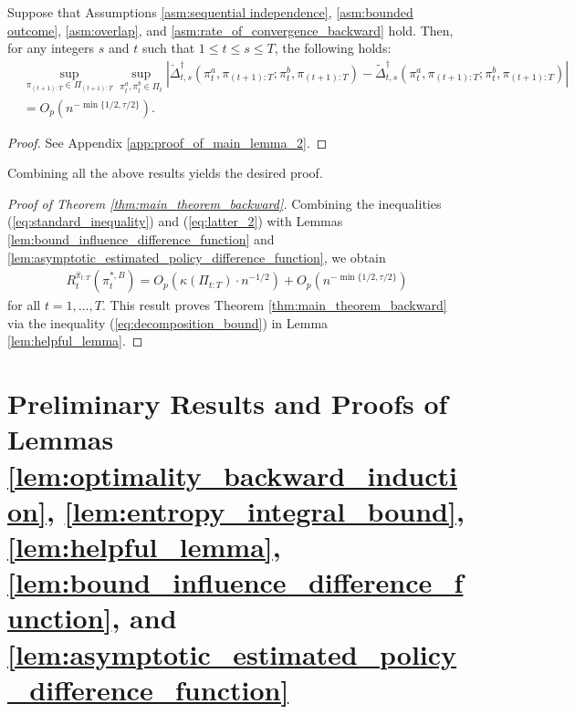 \begin{lemma}\label{lem:asymptotic_estimated_policy_difference_function}
Suppose that Assumptions \ref{asm:sequential independence}, \ref{asm:bounded outcome}, \ref{asm:overlap}, and \ref{asm:rate_of_convergence_backward} hold. Then, for any integers $s$ and $t$ such that $1\leq t \leq s \leq T$, the following holds:
\begin{align*}
    &\sup_{\pi_{(t+1):T} \in \Pi_{(t+1):T}}\sup_{\pi_{t}^{a},\pi_{t}^{b} \in \Pi_{t}} \left|\check{\Delta}_{t,s}^{\dagger}(\pi_{t}^{a},\pi_{(t+1):T};\pi_{t}^{b},\pi_{(t+1):T}) - \widetilde{\Delta}_{t,s}^{\dagger}(\pi_{t}^{a},\pi_{(t+1):T};\pi_{t}^{b},\pi_{(t+1):T})\right|\\
    &= O_{p}(n^{-\min\{1/2,\tau/2\}}).
\end{align*}
\end{lemma}

\begin{proof}
See Appendix \ref{app:proof_of_main_lemma_2}.
\end{proof}

\medskip

Combining all the above results yields the desired proof.

\noindent
\begin{proof}[Proof of Theorem \ref{thm:main_theorem_backward}]
Combining the inequalities (\ref{eq:standard_inequality}) and (\ref{eq:latter_2}) with Lemmas \ref{lem:bound_influence_difference_function} and \ref{lem:asymptotic_estimated_policy_difference_function}, we obtain 
\begin{align*}
    R_{t}^{\hat{\pi}_{t:T}}(\pi_{t}^{\ast,B}) = O_{p}\left(\kappa(\Pi_{t:T}) \cdot n^{-1/2}\right) + O_{p} (n^{-\min\{1/2,\tau/2\}}) 
\end{align*}
for all $t=1,\ldots,T$. This result proves Theorem \ref{thm:main_theorem_backward} via the inequality (\ref{eq:decomposition_bound}) in Lemma \ref{lem:helpful_lemma}. 
    
\end{proof}





\section{Preliminary Results and Proofs of Lemmas \ref{lem:optimality_backward_induction}, \ref{lem:entropy_integral_bound}, \ref{lem:helpful_lemma}, \ref{lem:bound_influence_difference_function}, and \ref{lem:asymptotic_estimated_policy_difference_function}}
\label{app:proofs_of_lemmas}

